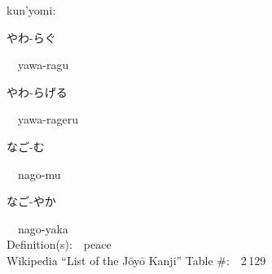 \begin{multicols}{2}
{\hspace*{1em}}kun'yomi:\ \ \\
{\hspace*{2em}}{\begin{CJK}{UTF8}{min} やわ-らぐ \end{CJK}}\ \ yawa-ragu\ \ \\
{\hspace*{2em}}{\begin{CJK}{UTF8}{min} やわ-らげる \end{CJK}}\ \ yawa-rageru\ \ \\
{\hspace*{2em}}{\begin{CJK}{UTF8}{min} なご-む \end{CJK}}\ \ nago-mu\ \ \\
{\hspace*{2em}}{\begin{CJK}{UTF8}{min} なご-やか \end{CJK}}\ \ nago-yaka\ \ \\
Definition(s):\ \ peace \\
Wikipedia ``List of the J\=oy\=o Kanji'' Table \#:\ \ 2\,129 \\
\ \ \\
\end{multicols}

\newpage



